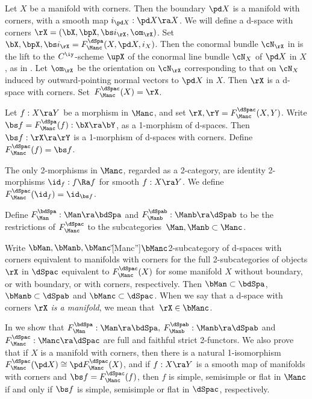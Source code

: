 \documentclass{article}
\begin{document}
\begin{dfn} Let $X$ be a manifold with corners. Then the
boundary $\pd X$ is a manifold with corners, with a smooth map
$i_{\pd X}:\pd X\ra X$. We will define a d-space with corners
$\rX=(\bX,\bpX,\bs i_\rX,\om_\rX)$. Set $\bX,\bpX,\bs
i_\rX=F_\Manc^\dSpa(X,\pd X,i_X)$. Then the conormal bundle
$\cN_\rX$ in  is the lift to the $C^\iy$-scheme $\upX$ of
the conormal line bundle $\cN_X$ of $\pd X$ in $X$, as in
. Let $\om_\rX$ be the orientation on $\cN_\rX$
corresponding to that on $\cN_X$ induced by outward-pointing normal
vectors to $\pd X$ in $X$. Then $\rX$ is a d-space with corners.
Set~$F_\Manc^\dSpac(X)=\rX$.

Let $f:X\ra Y$ be a morphism in $\Manc$, and set
$\rX,\rY=F_\Manc^\dSpac(X,Y)$. Write $\bs
f=F_\Manc^\dSpa(f):\bX\ra\bY$, as a 1-morphism of d-spaces. Then
$\bs f:\rX\ra\rY$ is a 1-morphism of d-spaces with corners.
Define~$F_\Manc^\dSpac(f)=\bs f$.

The only 2-morphisms in $\Manc$, regarded as a 2-category, are
identity 2-morphisms $\id_f:f\Ra f$ for smooth $f:X\ra Y$. We
define~$F_\Manc^\dSpac(\id_f)=\id_{\bs f}$.

Define $F_\Man^\bdSpa:\Man\ra\bdSpa$ and $F_\Manb^\dSpab:
\Manb\ra\dSpab$ to be the restrictions of $F_\Manc^\dSpac$ to the
subcategories~$\Man,\Manb\subset\Manc$.

Write $\bMan,\bManb,\bManc$\G[Manc'']{$\bManc$}{2-subcategory of
d-spaces with corners equivalent to manifolds with corners} for the
full 2-subcategories of objects $\rX$ in $\dSpac$ equivalent to
$F_\Manc^\dSpac(X)$ for some manifold $X$ without boundary, or with
boundary, or with corners, respectively. Then $\bMan\subset\bdSpa$,
$\bManb\subset\dSpab$ and $\bManc\subset\dSpac$. When we say that a
d-space with corners $\rX$ {\it is a manifold}, we mean
that~$\rX\in\bManc$.
\label{ds6def2}
\end{dfn}

In \cite[\S 6.4]{Joyc6} we show that $F_\Man^\bdSpa: \Man\ra\bdSpa,$
$F_\Manb^\dSpab:\Manb\ra\dSpab$ and $F_\Manc^\dSpac: \Manc\ra\dSpac$
are full and faithful strict
2-functors. We also prove that if $X$
is a manifold with corners, then there is a natural 1-isomorphism
$F_\Manc^\dSpac(\pd X)\cong \pd F_\Manc^\dSpac(X)$, and if $f:X\ra
Y$ is a smooth map of manifolds with corners and $\bs
f=F_\Manc^\dSpac(f)$, then $f$ is simple, semisimple or flat in
$\Manc$ if and only if $\bs f$ is simple, semisimple or flat in
$\dSpac$, respectively.
\end{document}
